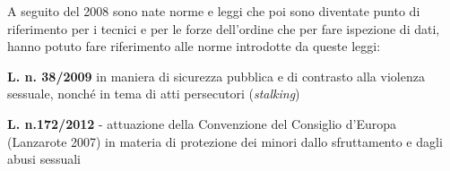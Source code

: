A seguito del 2008 sono nate norme e leggi che poi sono diventate punto di riferimento per i tecnici e per le forze dell'ordine che per fare ispezione di dati, hanno potuto fare riferimento alle norme introdotte da queste leggi:

\vspace{5mm}

\textbf{L. n. 38/2009} in maniera di sicurezza pubblica e di contrasto alla violenza sessuale, nonché in tema di atti persecutori (\textit{stalking})

\vspace{5mm}

\textbf{L. n.172/2012} - attuazione della Convenzione del Consiglio d'Europa (Lanzarote 2007) in materia di protezione dei minori dallo sfruttamento e dagli abusi sessuali



